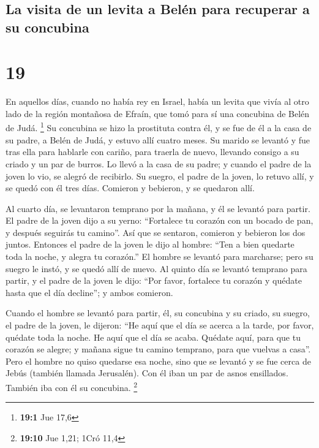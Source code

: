 \hypertarget{la-visita-de-un-levita-a-beluxe9n-para-recuperar-a-su-concubina}{%
\subsection{La visita de un levita a Belén para recuperar a su
concubina}\label{la-visita-de-un-levita-a-beluxe9n-para-recuperar-a-su-concubina}}

\hypertarget{section-18}{%
\section{19}\label{section-18}}

 En aquellos días, cuando no había rey en Israel, había un
levita que vivía al otro lado de la región montañosa de Efraín, que tomó
para sí una concubina de Belén de Judá. \footnote{\textbf{19:1} Jue 17,6}
 Su concubina se hizo la prostituta contra él, y se fue de
él a la casa de su padre, a Belén de Judá, y estuvo allí cuatro meses.
 Su marido se levantó y fue tras ella para hablarle con
cariño, para traerla de nuevo, llevando consigo a su criado y un par de
burros. Lo llevó a la casa de su padre; y cuando el padre de la joven lo
vio, se alegró de recibirlo.  Su suegro, el padre de la
joven, lo retuvo allí, y se quedó con él tres días. Comieron y bebieron,
y se quedaron allí.

 Al cuarto día, se levantaron temprano por la mañana, y él
se levantó para partir. El padre de la joven dijo a su yerno:
``Fortalece tu corazón con un bocado de pan, y después seguirás tu
camino''.  Así que se sentaron, comieron y bebieron los
dos juntos. Entonces el padre de la joven le dijo al hombre: ``Ten a
bien quedarte toda la noche, y alegra tu corazón.''  El
hombre se levantó para marcharse; pero su suegro le instó, y se quedó
allí de nuevo.  Al quinto día se levantó temprano para
partir, y el padre de la joven le dijo: ``Por favor, fortalece tu
corazón y quédate hasta que el día decline''; y ambos comieron.

 Cuando el hombre se levantó para partir, él, su concubina
y su criado, su suegro, el padre de la joven, le dijeron: ``He aquí que
el día se acerca a la tarde, por favor, quédate toda la noche. He aquí
que el día se acaba. Quédate aquí, para que tu corazón se alegre; y
mañana sigue tu camino temprano, para que vuelvas a casa''.
 Pero el hombre no quiso quedarse esa noche, sino que se
levantó y se fue cerca de Jebús (también llamada Jerusalén). Con él iban
un par de asnos ensillados. También iba con él su concubina. \footnote{\textbf{19:10}
  Jue 1,21; 1Cró 11,4}

